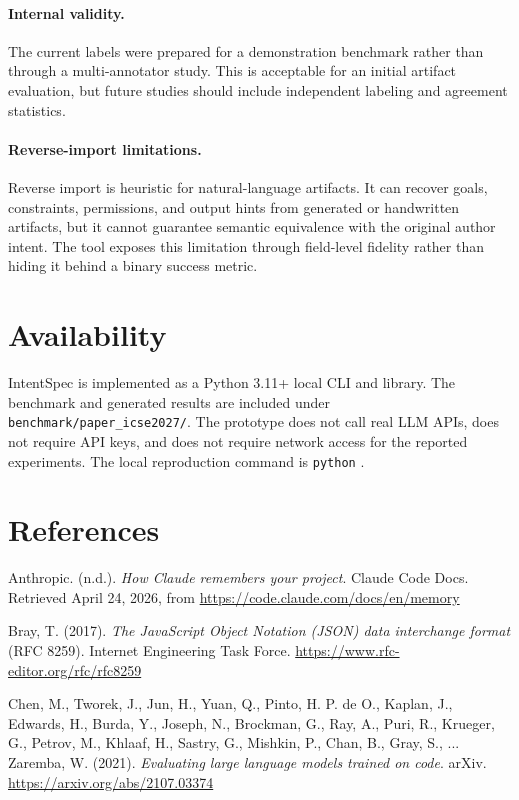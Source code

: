 \documentclass[11pt]{article}
\begin{document}
\paragraph{Internal validity.}
The current labels were prepared for a demonstration benchmark rather than through a
multi-annotator study. This is acceptable for an initial artifact evaluation, but
future studies should include independent labeling and agreement statistics.

\paragraph{Reverse-import limitations.}
Reverse import is heuristic for natural-language artifacts. It can recover goals,
constraints, permissions, and output hints from generated or handwritten artifacts,
but it cannot guarantee semantic equivalence with the original author intent. The
tool exposes this limitation through field-level fidelity rather than hiding it
behind a binary success metric.

\section{Availability}

IntentSpec is implemented as a Python 3.11+ local CLI and library. The benchmark and
generated results are included under \texttt{benchmark/paper\_icse2027/}. The
prototype does not call real LLM APIs, does not require API keys, and does not
require network access for the reported experiments. The local reproduction command
is \texttt{python} .

\section*{References}

Anthropic. (n.d.). \textit{How Claude remembers your project}. Claude Code Docs.
Retrieved April 24, 2026, from
\url{https://code.claude.com/docs/en/memory}

Bray, T. (2017). \textit{The JavaScript Object Notation (JSON) data interchange
format} (RFC 8259). Internet Engineering Task Force.
\url{https://www.rfc-editor.org/rfc/rfc8259}

Chen, M., Tworek, J., Jun, H., Yuan, Q., Pinto, H. P. de O., Kaplan, J.,
Edwards, H., Burda, Y., Joseph, N., Brockman, G., Ray, A., Puri, R.,
Krueger, G., Petrov, M., Khlaaf, H., Sastry, G., Mishkin, P., Chan, B.,
Gray, S., ... Zaremba, W. (2021). \textit{Evaluating large language models
trained on code}. arXiv. \url{https://arxiv.org/abs/2107.03374}
\end{document}
